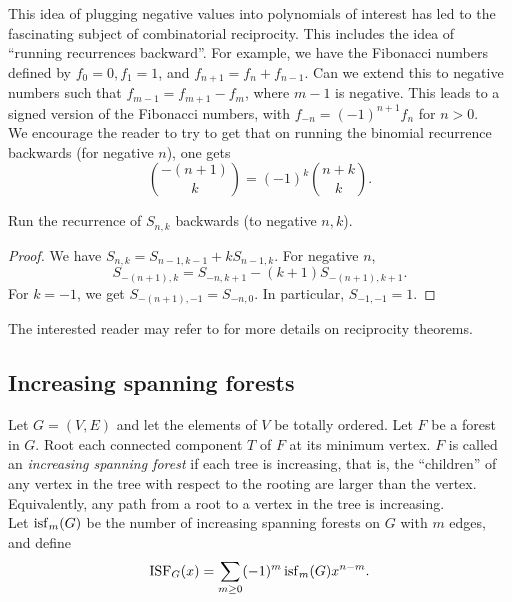 	This idea of plugging negative values into polynomials of interest has led to the fascinating subject of combinatorial reciprocity. This includes the idea of ``running recurrences backward''. For example, we have the Fibonacci numbers defined by $f_0 = 0, f_1 = 1$, and $f_{n+1} = f_n + f_{n-1}$. Can we extend this to negative numbers such that $f_{m-1} = f_{m+1} - f_{m}$, where $m-1$ is negative. This leads to a signed version of the Fibonacci numbers, with $f_{-n} = (-1)^{n+1} f_n$ for $n > 0$.\\
	
	We encourage the reader to try  to get that on running the binomial recurrence backwards (for negative $n$), one gets
	\[ \binom{-(n+1)}{k} = (-1)^k \binom{n+k}{k}. \]

	\begin{exercise}
		Run the recurrence of $S_{n,k}$ backwards (to negative $n,k$).
	\end{exercise}
	\begin{proof}
		We have $S_{n,k} = S_{n-1,k-1} + k S_{n-1,k}$. For negative $n$,
		\[ S_{-(n+1),k} = S_{-n,k+1} - (k+1) S_{-(n+1),k+1}. \]
		For $k=-1$, we get $S_{-(n+1),-1} = S_{-n,0}$. In particular, $S_{-1,-1} = 1$.
	\end{proof}

	The interested reader may refer to \cite{crt} for more details on reciprocity theorems.

\subsection{Increasing spanning forests}

	\begin{fdef}
		Let $G = (V,E)$ and let the elements of $V$ be totally ordered. Let $F$ be a forest in $G$. Root each connected component $T$ of $F$ at its minimum vertex. $F$ is called an \emph{increasing spanning forest} if each tree is increasing, that is, the ``children'' of any vertex in the tree with respect to the rooting are larger than the vertex. Equivalently, any path from a root to a vertex in the tree is increasing.\\
		Let $\operatorname{isf}_m(G)$ be the number of increasing spanning forests on $G$ with $m$ edges, and define
		\[ \operatorname{ISF}_G(x) = \sum_{m \ge 0} (-1)^m \operatorname{isf}_m(G) x^{n-m}. \]
	\end{fdef}

